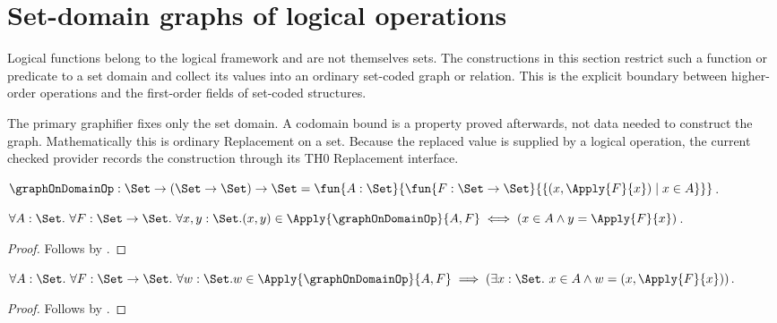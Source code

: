 \section{Set-domain graphs of logical operations}




Logical functions belong to the logical framework and are not themselves
sets.  The constructions in this section restrict such a function or
predicate to a set domain and collect its values into an ordinary set-coded
graph or relation.  This is the explicit boundary between higher-order
operations and the first-order fields of set-coded structures.

The primary graphifier fixes only the set domain.  A codomain bound is a
property proved afterwards, not data needed to construct the graph.
Mathematically this is ordinary Replacement on a set.  Because the replaced
value is supplied by a logical operation, the current checked provider records
the construction through its TH0 Replacement interface.

\begin{definition}\label{logical_graph_on_domain}
    $\graphOnDomainOp:\Set\to(\Set\to\Set)\to\Set
        =\fun{A:\Set}{
            \fun{F:\Set\to\Set}{
                \{(x,\Apply{F}{x})\mid x\in A\}}}$.
\end{definition}

\begin{proposition}\label{logical_graph_on_domain_membership}
    $\forall A:\Set.\ \forall F:\Set\to\Set.\ \forall x,y:\Set.
        (x,y)\in\Apply{\graphOnDomainOp}{A,F}
        \iff (x\in A\land y=\Apply{F}{x})$.
\end{proposition}
\begin{proof}
    Follows by .
\end{proof}

\begin{proposition}\label{logical_graph_on_domain_elim}
    $\forall A:\Set.\ \forall F:\Set\to\Set.\ \forall w:\Set.
        w\in\Apply{\graphOnDomainOp}{A,F}
        \implies
        (\exists x:\Set.\ x\in A\land w=(x,\Apply{F}{x}))$.
\end{proposition}
\begin{proof}
    Follows by .
\end{proof}

